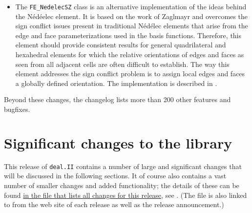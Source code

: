 \documentclass{ansarticle-preprint}
\newcommand{\specialword}[1]{\texttt{#1}}
\newcommand{\dealii}{{\specialword{deal.II}}\xspace}
\begin{document}
\begin{itemize}
  The current implementation of the element only works for
  parallelogram meshes due to difficulties associated with the mapping
  of shape functions: The shape functions of the $Q_1^d$ part of the
  element need to be mapped as scalars, as is common for the vector
  components of the $Q_1^d$ element; on the other hand, the
  vector-valued edge bubble functions need to be mapped using the
  Piola transform as is common for the Raviart-Thomas
  element. \dealii{} does not currently have the ability to use
  different mappings for individual shape functions, though this
  functionality is planned for the next release.

\item The \texttt{FE\_NedelecSZ} class is an alternative
  implementation of the ideas behind the N{\'e}d{\'e}elec element. It is based
  on the work of Zaglmayr \cite{Zag06} and overcomes the
  sign conflict issues present in traditional N{\'e}d{\'e}lec
  elements that arise from the edge and face parameterizations used
  in the basis functions. Therefore, this element should provide
  consistent results for general quadrilateral and hexahedral
  elements for which the relative orientations of edges and faces as
  seen from all adjacent cells are often difficult to establish.
  The way this element addresses the sign conflict problem is to assign
  local edges and faces a globally defined orientation. The
  implementation is described in \cite{Kynch2017}.

\end{itemize}

Beyond these changes, the changelog lists more than 200 other features and bugfixes.




\section{Significant changes to the library}

This release of \dealii contains a number of large and significant changes
that will be discussed in the following sections. It of course also contains a
vast number of smaller changes and added functionality; the details of these
can be found
\href{https://dealii.org/developer/doxygen/deal.II/changes_between_9_0_1_and_9_1_0.html}{
in the file that lists all changes for this release}, see \cite{changes91}.
(The file is also linked to from the web site of each release as well as
the release announcement.)
\end{document}
